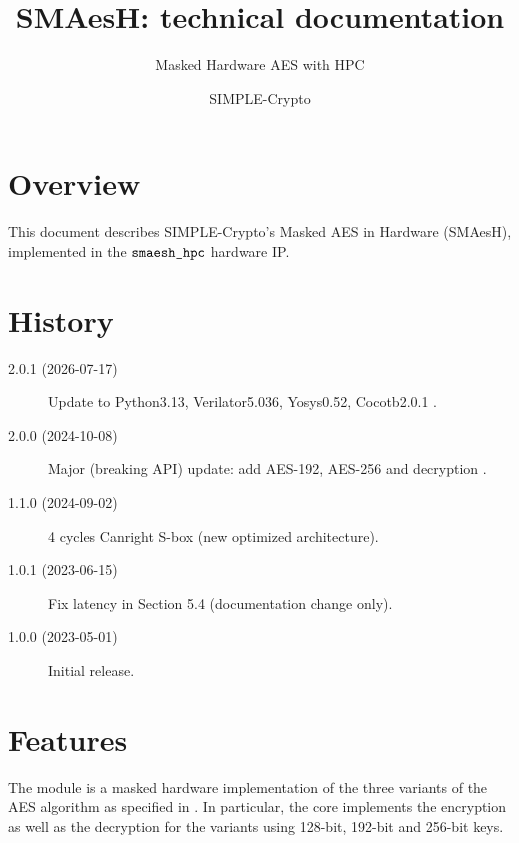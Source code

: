 \documentclass{scrartcl}
\title{SMAesH: technical documentation}
\subtitle{Masked Hardware AES with HPC}
\author{SIMPLE-Crypto}
\date{}
\begin{document}


\maketitle

\tableofcontents

\section{Overview}
\label{section:overview}
This document describes SIMPLE-Crypto's Masked AES in Hardware (SMAesH),
implemented in the $\texttt{smaesh\_hpc}$ hardware IP. 

\section{History}
\begin{description}
    \item[2.0.1 (2026-07-17)] Update to Python3.13, Verilator5.036, Yosys0.52, Cocotb2.0.1 .
    \item[2.0.0 (2024-10-08)] Major (breaking API) update: add AES-192, AES-256 and decryption .
    \item[1.1.0 (2024-09-02)] 4 cycles Canright S-box (new optimized architecture).
    \item[1.0.1 (2023-06-15)] Fix latency in Section 5.4 (documentation change only).
    \item[1.0.0 (2023-05-01)] Initial release.
\end{description}

\section{Features}
The \core{} module is a masked hardware implementation of the three variants of
the AES algorithm as specified in \cite{nist197}. In particular, the core
implements the encryption as well as the decryption for the variants using
128-bit, 192-bit and 256-bit keys.  
\end{document}
